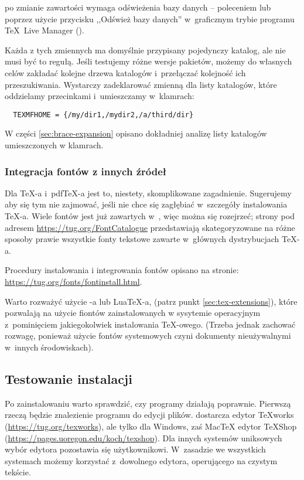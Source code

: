 \documentclass{article}
\begin{document}
 po zmianie zawartości wymaga odświeżenia bazy danych --
poleceniem  lub poprzez użycie przycisku ,,Odśwież bazy
danych'' w~graficznym trybie programu \TeX\ Live Manager ().

Każda z tych zmiennych ma domyślnie przypisany pojedynczy katalog, ale
nie musi być to regułą. Jeśli testujemy różne wersje pakietów, możemy
do własnych celów zakładać kolejne drzewa katalogów i~przełączać kolejność
ich przeszukiwania. Wystarczy zadeklarować zmienną 
dla listy katalogów, które oddzielamy przecinkami i~umieszczamy w~klamrach:

\begin{verbatim}
  TEXMFHOME = {/my/dir1,/mydir2,/a/third/dir}
\end{verbatim}

W części \ref{sec:brace-expansion} opisano dokładniej analizę listy
katalogów umieszczonych w klamrach.

\subsubsection{Integracja fontów z innych źródeł}

Dla \TeX-a i~pdf\TeX-a jest to, niestety, skomplikowane zagadnienie. Sugerujemy
aby się tym nie zajmować, jeśli nie chce się zagłębiać w~szczegóły instalowania \TeX-a.
Wiele fontów jest już zawartych w~\TL, więc można się rozejrzeć; strony pod adresem
\url{https://tug.org/FontCatalogue} przedstawiają skategoryzowane na różne sposoby prawie
wszystkie fonty tekstowe zawarte w~głównych dystrybucjach \TeX-a.

Procedury instalowania i integrowania fontów opisano na stronie:
\url{https://tug.org/fonts/fontinstall.html}.

Warto rozważyć użycie \XeTeX-a lub Lua\TeX-a, (patrz punkt \ref{sec:tex-extensions}),
które pozwalają na użycie fiontów zainstalowanych w sysytemie operacyjnym z~pominięciem
jakiegokolwiek instalowania \TeX-owego. (Trzeba jednak zachować rozwagę,
ponieważ użycie fontów systemowych czyni dokumenty nieużywalnymi w~innych środowiskach).

\subsection{Testowanie instalacji}
\label{sec:test-install}

Po zainstalowaniu \TL{} warto sprawdzić, czy programy działają
poprawnie. Pierwszą rzeczą będzie znalezienie programu do edycji plików.
\TL{} dostarcza edytor \TeX{}works (\url{https://tug.org/texworks}), ale tylko
dla Windows, zaś Mac\TeX{} edytor
TeXShop (\url{https://pages.uoregon.edu/koch/texshop}).
Dla innych systemów uniksowych
wybór edytora pozostawia się  użytkownikowi. W~zasadzie we wszystkich
systemach możemy korzystać z~dowolnego edytora, operującego na czystym
tekście.
\end{document}
